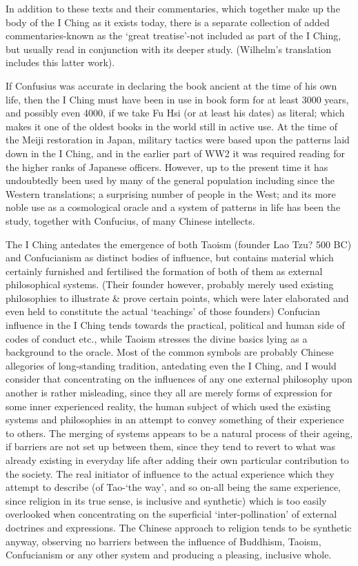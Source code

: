 \documentclass[11pt]{book}
\begin{document}
In addition to these texts and their commentaries, which together make up the body of the I Ching as it exists today, there is a separate collection of added commentaries-known as the `great treatise'-not included as part of the I Ching, but usually read in conjunction with its deeper study. (Wilhelm's translation includes this latter work).

If Confusius was accurate in declaring the book ancient at the time of his own life, then the I Ching must have been in use in book form for at least 3000 years, and possibly even 4000, if we take Fu Hsi (or at least his dates) as literal; which makes it one of the oldest books in the world still in active use. At the time of the Meiji restoration in Japan, military tactics were based upon the patterns laid down in the I Ching, and in the earlier part of WW2 it was required reading for the higher ranks of Japanese officers. However, up to the present time it has undoubtedly been used by many of the general population including since the Western translations; a surprising number of people in the West; and its more noble use as a cosmological oracle and a system of patterns in life has been the study, together with Confucius, of many Chinese intellects.

The I Ching antedates the emergence of both Taoism (founder Lao Tzu? 500 BC) and Confucianism as distinct bodies of influence, but contains material which certainly furnished and fertilised the formation of both of them as external philosophical systems. (Their founder however, probably merely used existing philosophies to illustrate \& prove certain points, which were later elaborated and even held to constitute the actual `teachings' of those founders) Confucian influence in the I Ching tends towards the practical, political and human side of codes of conduct etc., while Taoism stresses the divine basics lying as a background to the oracle. Most of the common symbols are probably Chinese allegories of long-standing tradition, antedating even the I Ching, and I would consider that concentrating on the influences of any one external philosophy upon another is rather misleading, since they all are merely forms of expression for some inner experienced reality, the human subject of which used the existing systems and philosophies in an attempt to convey something of their experience to others. The merging of systems appears to be a natural process of their ageing, if barriers are not set up between them, since they tend to revert to what was already existing in everyday life after adding their own particular contribution to the society. The real initiator of influence to the actual experience which they attempt to describe (of Tao-`the way', and so on-all being the same experience, since religion in its true sense, is inclusive and synthetic) which is too easily overlooked when concentrating on the superficial `inter-pollination' of external doctrines and expressions. The Chinese approach to religion tends to be synthetic anyway, observing no barriers between the influence of Buddhism, Taoism, Confucianism or any other system and producing a pleasing, inclusive whole.
\end{document}
